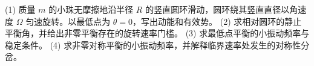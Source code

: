 (1) 质量 \(m\) 的小珠无摩擦地沿半径 \(R\) 的竖直圆环滑动，圆环绕其竖直直径以角速度 \(\Omega\) 匀速旋转。以最低点为 \(\theta=0\)，写出动能和有效势。
(2) 求相对圆环的静止平衡角，并给出非零平衡存在的旋转速率门槛。
(3) 求最低点平衡的小振动频率与稳定条件。
(4) 求非零对称平衡的小振动频率，并解释临界速率处发生的对称性分岔。
